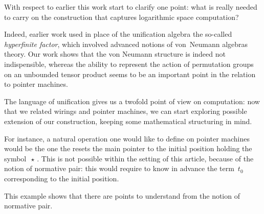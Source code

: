 With respect to earlier \cite{girard_normativity_2012,aubert_characterizing_2012,seiller_logarithmic_2013} this work start to clarify one point: what is really needed to carry on the construction that captures logarithmic space computation?

Indeed, earlier work used in place of the unification algebra the so-called \emph{hyperfinite factor}, which involved advanced notions of von~Neumann algebras theory. Our work shows that the von Neumann structure is indeed not indispensible, whereas the ability to represent the action of permutation groups on an unbounded tensor product seems to be an important point in the relation to pointer machines.

\smallskip
The language of unification gives us a twofold point of view on computation: now that we related wirings and pointer machines, we can start exploring possible extension of our construction, keeping some mathematical structuring in mind.

For instance, a natural operation one would like to define on pointer machines would be the one the resets the main pointer to the initial position holding the symbol $\,\star\,$. This is not possible within the setting of this article, because of the notion of normative pair: this would require to know in advance the term $\,t_0\,$ corresponding to the initial position.

\smallskip
This example shows that there are points to understand from the notion of normative pair. 
